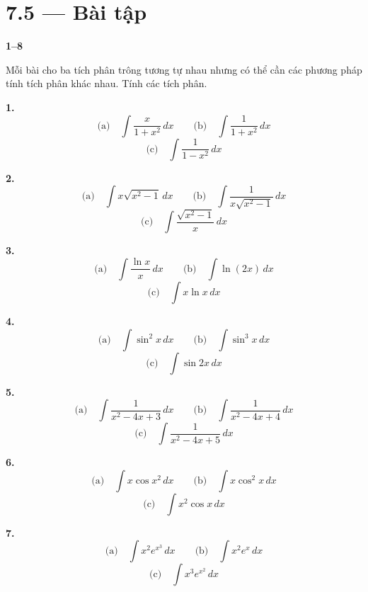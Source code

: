 \documentclass[12pt,a4paper]{article}
\newcommand{\bt}[1]{\par\smallskip\Needspace{5\baselineskip}\noindent\textbf{#1.}\ }
\newcommand{\group}[1]{\par\Needspace{11\baselineskip}\medskip\noindent\textbf{#1}\par\nopagebreak[4]}
\begin{document}
\section*{7.5 — Bài tập}
\group{1–8}
Mỗi bài cho ba tích phân trông tương tự nhau nhưng có thể cần các phương pháp tính tích phân khác nhau. Tính các tích phân.
\par\noindent\begin{minipage}[t]{\linewidth}
\bt{1}
\[\text{(a)}\quad\int\frac{x}{1+x^2}\,dx\qquad\text{(b)}\quad\int\frac1{1+x^2}\,dx\]
\[\text{(c)}\quad\int\frac1{1-x^2}\,dx\]
\end{minipage}\par
\par\noindent\begin{minipage}[t]{\linewidth}
\bt{2}
\[\text{(a)}\quad\int x\sqrt{x^2-1}\,dx\qquad\text{(b)}\quad\int\frac1{x\sqrt{x^2-1}}\,dx\]
\[\text{(c)}\quad\int\frac{\sqrt{x^2-1}}{x}\,dx\]
\end{minipage}\par
\par\noindent\begin{minipage}[t]{\linewidth}
\bt{3}
\[\text{(a)}\quad\int\frac{\ln x}{x}\,dx\qquad\text{(b)}\quad\int\ln(2x)\,dx\]
\[\text{(c)}\quad\int x\ln x\,dx\]
\end{minipage}\par
\par\noindent\begin{minipage}[t]{\linewidth}
\bt{4}
\[\text{(a)}\quad\int\sin^2x\,dx\qquad\text{(b)}\quad\int\sin^3x\,dx\]
\[\text{(c)}\quad\int\sin2x\,dx\]
\end{minipage}\par
\par\noindent\begin{minipage}[t]{\linewidth}
\bt{5}
\[\text{(a)}\quad\int\frac1{x^2-4x+3}\,dx\qquad\text{(b)}\quad\int\frac1{x^2-4x+4}\,dx\]
\[\text{(c)}\quad\int\frac1{x^2-4x+5}\,dx\]
\end{minipage}\par
\par\noindent\begin{minipage}[t]{\linewidth}
\bt{6}
\[\text{(a)}\quad\int x\cos x^2\,dx\qquad\text{(b)}\quad\int x\cos^2x\,dx\]
\[\text{(c)}\quad\int x^2\cos x\,dx\]
\end{minipage}\par
\par\noindent\begin{minipage}[t]{\linewidth}
\bt{7}
\[\text{(a)}\quad\int x^2e^{x^3}\,dx\qquad\text{(b)}\quad\int x^2e^x\,dx\]
\[\text{(c)}\quad\int x^3e^{x^2}\,dx\]
\end{minipage}\par
\end{document}
